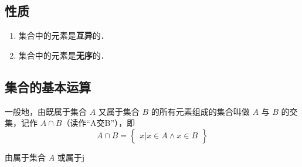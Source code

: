 \subsection{性质}
\begin{enumerate}
\item 集合中的元素是\textbf{互异}的．
\item 集合中的元素是\textbf{无序}的．
\end{enumerate}

\subsection{集合的基本运算}
一般地，由既属于集合 $A$ 又属于集合 $B$ 的所有元素组成的集合叫做 $A$ 与 $B$ 的交集，记作 $A \cap B$（读作“A交B”），即
\begin{equation}
A\cap B = \begin{Bmatrix} x|x\in A \wedge x\in B \end{Bmatrix}
\end{equation}

由属于集合 $A$ 或属于j